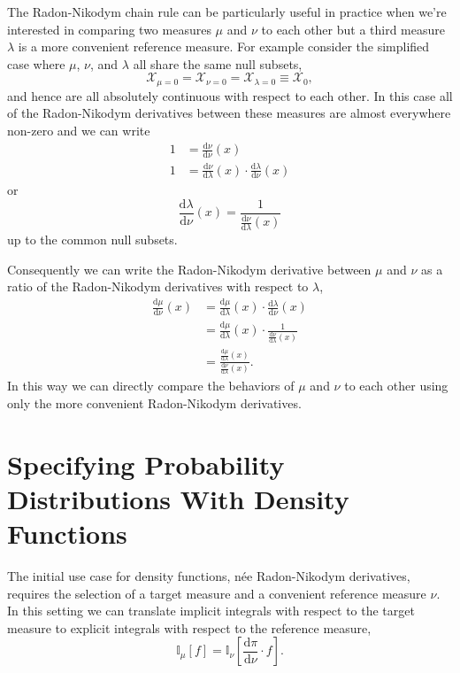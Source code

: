 \documentclass[
  letterpaper,
  DIV=11,
  numbers=noendperiod]{scrartcl}
\begin{document}
The Radon-Nikodym chain rule can be particularly useful in practice when
we're interested in comparing two measures \(\mu\) and \(\nu\) to each
other but a third measure \(\lambda\) is a more convenient reference
measure. For example consider the simplified case where \(\mu\),
\(\nu\), and \(\lambda\) all share the same null subsets, \[
  \mathcal{X}_{\mu = 0}
= \mathcal{X}_{\nu = 0}
= \mathcal{X}_{\lambda = 0}
\equiv \mathcal{X}_{0},
\] and hence are all absolutely continuous with respect to each other.
In this case all of the Radon-Nikodym derivatives between these measures
are almost everywhere non-zero and we can write \begin{align*}
1
&=
\frac{ \mathrm{d} \nu}{ \mathrm{d} \nu}(x)
\\
1
&=
\frac{ \mathrm{d} \nu}{ \mathrm{d} \lambda }(x) \cdot
\frac{ \mathrm{d} \lambda}{ \mathrm{d} \nu }(x)
\end{align*} or \[
\frac{ \mathrm{d} \lambda}{ \mathrm{d} \nu }(x)
=
\frac{1}{ \frac{ \mathrm{d} \nu}{ \mathrm{d} \lambda }(x) }
\] up to the common null subsets.

Consequently we can write the Radon-Nikodym derivative between \(\mu\)
and \(\nu\) as a ratio of the Radon-Nikodym derivatives with respect to
\(\lambda\), \begin{align*}
\frac{ \mathrm{d} \mu}{ \mathrm{d} \nu}(x)
&=
\frac{ \mathrm{d} \mu}{ \mathrm{d} \lambda }(x) \cdot
\frac{ \mathrm{d} \lambda}{ \mathrm{d} \nu }(x)
\\
&=
\frac{ \mathrm{d} \mu}{ \mathrm{d} \lambda }(x) \cdot
\frac{1}{ \frac{ \mathrm{d} \nu}{ \mathrm{d} \lambda }(x) }
\\
&=
\frac{ \frac{ \mathrm{d} \mu}{ \mathrm{d} \lambda }(x) }
{ \frac{ \mathrm{d} \nu}{ \mathrm{d} \lambda }(x) }.
\end{align*} In this way we can directly compare the behaviors of
\(\mu\) and \(\nu\) to each other using only the more convenient
Radon-Nikodym derivatives.

\hypertarget{specifying-probability-distributions-with-density-functions}{%
\section{Specifying Probability Distributions With Density
Functions}\label{specifying-probability-distributions-with-density-functions}}

The initial use case for density functions, née Radon-Nikodym
derivatives, requires the selection of a target measure and a convenient
reference measure \(\nu\). In this setting we can translate implicit
integrals with respect to the target measure to explicit integrals with
respect to the reference measure, \[
\mathbb{I}_{\mu}[f] =
\mathbb{I}_{\nu}
\left[ \frac{ \mathrm{d} \pi}{ \mathrm{d} \nu } \cdot f \right].
\]
\end{document}
